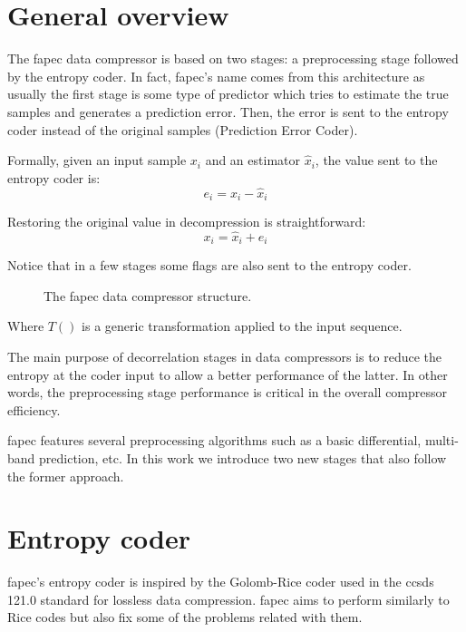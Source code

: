 \section{General overview}
The \acrshort{fapec} data compressor is based on two stages: a preprocessing stage followed by the entropy coder. In fact, \acrshort{fapec}'s name comes from this architecture as usually the first stage is some type of predictor which tries to estimate the true samples and generates a prediction error. Then, the error is sent to the entropy coder instead of the original samples (Prediction Error Coder).

Formally, given an input sample $x_i$ and an estimator $\hat{x}_i$, the value sent to the entropy coder is:
\begin{equation}
e_i = x_i - \hat{x}_i
\end{equation}

Restoring the original value in decompression is straightforward:
\begin{equation}
x_i = \hat{x}_i + e_i
\end{equation}

Notice that in a few stages some flags are also sent to the entropy coder.

\begin{figure}[h!]
	\begin{center}
		\scalebox{.565}{}
	\end{center}
	\caption{The \acrshort{fapec} data compressor structure.}
	\label{fig:fapec_structure}
\end{figure}

Where $T()$ is a generic transformation applied to the input sequence.

The main purpose of decorrelation stages in data compressors is to reduce the entropy at the coder input to allow a better performance of the latter. In other words, the preprocessing stage performance is critical in the overall compressor efficiency.

\acrshort{fapec} features several preprocessing algorithms such as a basic differential, multi-band prediction, etc. In this work we introduce two new stages that also follow the former approach.

\section{Entropy coder} \label{sec:entropy_coder}
\acrshort{fapec}'s entropy coder is inspired by the Golomb-Rice coder used in the \acrshort{ccsds} 121.0 standard for lossless data compression. \acrshort{fapec} aims to perform similarly to Rice codes but also fix some of the problems related with them.

